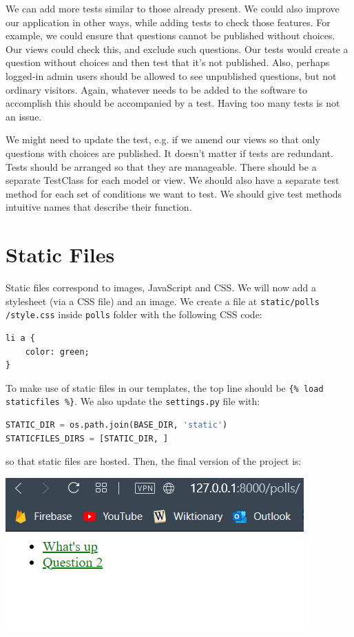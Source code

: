 \documentclass[a4paper, openany]{memoir}
\begin{document}
    We can add more tests similar to those already present. We could also improve our application in other ways, while adding tests to check those features. For example, we could ensure that questions cannot be published without choices. Our views could check this, and exclude such questions. Our tests would create a question without choices and then test that it's not published. Also, perhaps logged-in admin users should be allowed to see unpublished questions, but not ordinary visitors. Again, whatever needs to be added to the software to accomplish this should be accompanied by a test. Having too many tests is not an issue.

    \noindent We might need to update the test, e.g. if we amend our views so that only questions with choices are published. It doesn't matter if tests are redundant. Tests should be arranged so that they are manageable. There should be a separate TestClass for each model or view. We should also have a separate test method for each set of conditions we want to test. We should give test methods intuitive names that describe their function.
    \newpage

    \section{Static Files}
    Static files correspond to images, JavaScript and CSS. We will now add a stylesheet (via a CSS file) and an image. We create a file at \texttt{static/polls} \texttt{/style.css} inside \texttt{polls} folder with the following CSS code:
\begin{lstlisting}
li a {
    color: green;
}
\end{lstlisting}
    To make use of static files in our templates, the top line should be \texttt{\{\% load staticfiles \%\}}. We also update the \texttt{settings.py} file with:
\begin{lstlisting}[language=python]
STATIC_DIR = os.path.join(BASE_DIR, 'static')
STATICFILES_DIRS = [STATIC_DIR, ]
\end{lstlisting}
    so that static files are hosted. Then, the final version of the project is:
    \begin{center}
        \includegraphics[scale=0.6]{src/Django12.PNG}
    \end{center}
\end{document}
